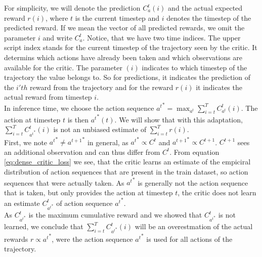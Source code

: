 For simplicity, we will denote the prediction 
$C_a^t(i)$ and the actual expected reward $r(i)$, where $t$ is the current timestep and $i$ denotes the timestep of the predicted reward. If we mean the vector of all predicted rewards, we omit the 
parameter $i$ and write $C_a^t$. Notice, that we have two time indices. The upper script index stands for the current timestep of the trajectory seen by the critic. 
It determins which actions have already been taken and 
which observations are available for the critic. The parameter $(i)$ indicates to which timestep of the trajectory the value belongs to. So for predictions, it indicates the prediction of the $i'th$ 
reward from the trajectory and for the reward $r(i)$ it indicates the actual reward from timestep $i$.\\ 
In inference time, we choose the action sequence 
${a^t}^* = \max_{a^t} \sum_{i=t}^T C_{a^t}^t(i)$. The action at timestep $t$ is then ${a^t}^*(t)$. We will show that with this adaptation, $\sum_{i=t}^T C_{{a^t}^*}^t(i)$ is not an unbiased estimate of 
$\sum_{i=t}^T r(i)$.\\
First, we note ${a^t}^* \neq {a^{t+1}}^*$ in general, as ${a^t}^* \propto C^t$ and ${a^{t+1}}^* \propto C^{t+1}$. $C^{t+1}$ sees an additional observation and can thus differ from $C^{t}$. 
From equation \ref{eq:dense_critic_loss} we see, that the critic learns an estimate of the empiciral distribution of action sequences that are present in the train dataset, so action sequences that 
were actually taken. As ${a^t}^*$ is generally not the action sequence that is taken, but only provides the action at timestep $t$, the critic does not learn an estimate $C_{{a^t}^*}^t$ of action sequence 
${a^t}^*$. \\
As $C_{{a^t}^*}^t$ is the maximum cumulative reward and we showed that $C_{{a^t}^*}^t$ is not learned, we conclude that $\sum_{i=t}^T C_{{a^t}^*}^t(i)$ 
will be an overestmation of the actual rewards $r \propto {a^t}^*$, were the action sequence ${a^t}^*$ is used for all actions of the trajectory. \\

